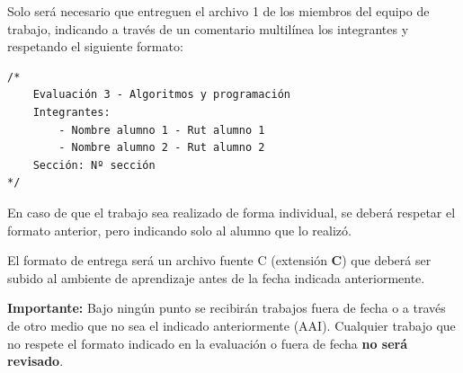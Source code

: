 \documentclass[]{article}
\begin{document}
    Solo será necesario que entreguen el archivo 1 de los miembros del equipo de trabajo, indicando a través de un comentario multilínea los integrantes y respetando el siguiente formato:\\

    \begin{listing}[H]
        \begin{verbatim}
/*
    Evaluación 3 - Algoritmos y programación
    Integrantes:
        - Nombre alumno 1 - Rut alumno 1
        - Nombre alumno 2 - Rut alumno 2
    Sección: Nº sección
*/
        \end{verbatim}
    \end{listing}

    En caso de que el trabajo sea realizado de forma individual, se deberá respetar el formato anterior, pero indicando solo al alumno que lo realizó.

    El formato de entrega será un archivo fuente C (extensión \textbf{C}) que deberá ser subido al ambiente de aprendizaje antes de la fecha indicada anteriormente. 

    \textbf{Importante:} Bajo ningún punto se recibirán trabajos fuera de fecha o a través de otro medio que no sea el indicado anteriormente (AAI). Cualquier trabajo que no respete el formato indicado en la evaluación o fuera de fecha \textbf{no será revisado}. 
\end{document}
